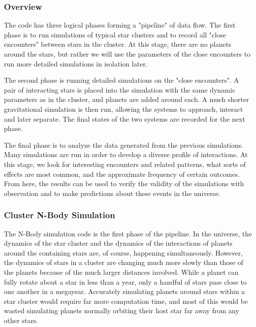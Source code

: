 \documentclass[12pt]{article}
\begin{document}
    \subsubsection{Overview}

    The code has three logical phases forming a "pipeline" of data flow. 
    The first phase is to run simulations of typical
    star clusters and to record all "close encounters" between stars in the cluster.
    At this stage, there are no planets around the stars, but rather we will use the
    parameters of the close encounters to run more detailed simulations in isolation
    later.

    The second phase is running detailed simulations on the "close encounters". 
    A pair of interacting stars
    is placed into the simulation with the same dynamic parameters as in the cluster,
    and planets are added around each. A much shorter gravitational simulation is then
    run, allowing the systems to approach, interact and later separate. The final
    states of the two systems are recorded for the next phase.

    The final phase is to analyze the data generated from the previous simulations.
    Many simulations are run in order to develop a diverse profile of interactions.
    At this stage, we look for interesting encounters and related patterns, 
    what sorts of effects are most common,
    and the approximate frequency of certain outcomes. From here, the results can
    be used to verify the validity of the simulations with observation and to make
    predictions about these events in the universe.

    \subsubsection{Cluster N-Body Simulation}

    The N-Body simulation code is the first phase of the pipeline. In the
    universe, the dynamics of the star cluster and the dynamics of the
    interactions of planets around the containing stars are, of course, happening
    simultaneously. However, the dynamics of stars in a cluster are changing much
    more slowly than those of the planets because of the much larger distances
    involved. While a planet can fully rotate about a star in less than a year,
    only a handful of stars pass close to one another in a megayear. Accurately
    simulating planets around stars within a star cluster would require
    far more computation time, and most of this would be wasted simulating
    planets normally orbiting their host star far away from any other stars.
\end{document}
